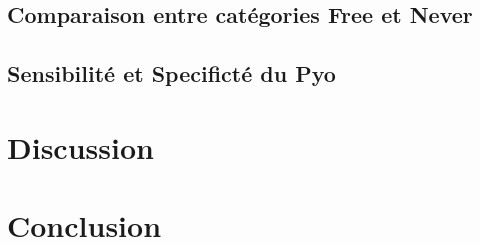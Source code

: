 \documentclass[12pt,a4paper]{article}
\begin{document}
\subsection{Comparaison entre catégories Free et Never}

\subsection{Sensibilité et Specificté du Pyo}

\section{Discussion}


\section{Conclusion}





\newpage



\newpage




\end{document}
